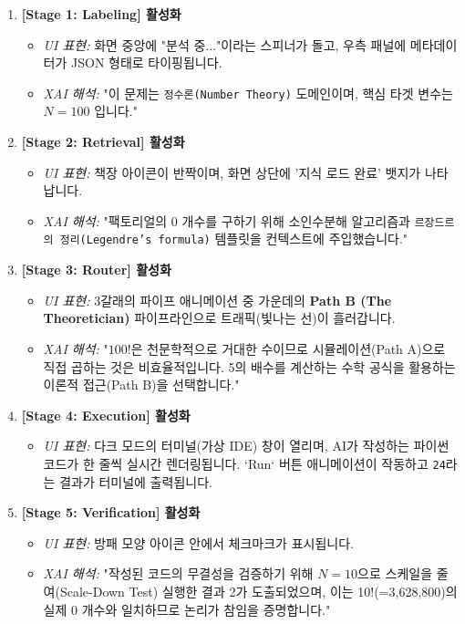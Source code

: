 \begin{enumerate}
    \item \textbf{[Stage 1: Labeling] 활성화}
    \begin{itemize}
        \item \textit{UI 표현:} 화면 중앙에 "분석 중..."이라는 스피너가 돌고, 우측 패널에 메타데이터가 JSON 형태로 타이핑됩니다.
        \item \textit{XAI 해석:} "이 문제는 \texttt{정수론(Number Theory)} 도메인이며, 핵심 타겟 변수는 $N=100$ 입니다."
    \end{itemize}
    
    \item \textbf{[Stage 2: Retrieval] 활성화}
    \begin{itemize}
        \item \textit{UI 표현:} 책장 아이콘이 반짝이며, 화면 상단에 '지식 로드 완료' 뱃지가 나타납니다.
        \item \textit{XAI 해석:} "팩토리얼의 0 개수를 구하기 위해 소인수분해 알고리즘과 \texttt{르장드르의 정리(Legendre's formula)} 템플릿을 컨텍스트에 주입했습니다."
    \end{itemize}
    
    \item \textbf{[Stage 3: Router] 활성화}
    \begin{itemize}
        \item \textit{UI 표현:} 3갈래의 파이프 애니메이션 중 가운데의 \textbf{Path B (The Theoretician)} 파이프라인으로 트래픽(빛나는 선)이 흘러갑니다.
        \item \textit{XAI 해석:} "$100!$은 천문학적으로 거대한 수이므로 시뮬레이션(Path A)으로 직접 곱하는 것은 비효율적입니다. 5의 배수를 계산하는 수학 공식을 활용하는 이론적 접근(Path B)을 선택합니다."
    \end{itemize}
    
    \item \textbf{[Stage 4: Execution] 활성화}
    \begin{itemize}
        \item \textit{UI 표현:} 다크 모드의 터미널(가상 IDE) 창이 열리며, AI가 작성하는 파이썬 코드가 한 줄씩 실시간 렌더링됩니다. `Run` 버튼 애니메이션이 작동하고 \texttt{24}라는 결과가 터미널에 출력됩니다.
    \end{itemize}
    
    \item \textbf{[Stage 5: Verification] 활성화}
    \begin{itemize}
        \item \textit{UI 표현:} 방패 모양 아이콘 안에서 체크마크가 표시됩니다.
        \item \textit{XAI 해석:} "작성된 코드의 무결성을 검증하기 위해 $N=10$으로 스케일을 줄여(Scale-Down Test) 실행한 결과 2가 도출되었으며, 이는 10!(=3,628,800)의 실제 0 개수와 일치하므로 논리가 참임을 증명합니다."
    \end{itemize}
\end{enumerate}


